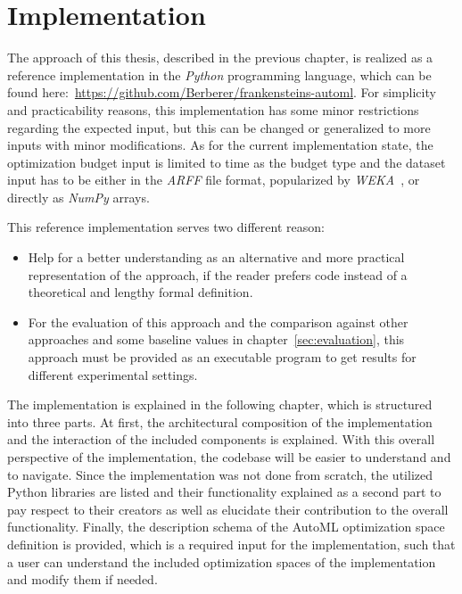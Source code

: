 %
\chapter{Implementation}
\label{sec:implementation}
The approach of this thesis, described in the previous chapter, is realized as a reference implementation in the \textit{Python} programming language, which can be found here:~\url{https://github.com/Berberer/frankensteins-automl}.\newline
For simplicity and practicability reasons, this implementation has some minor restrictions regarding the expected input, but this can be changed or generalized to more inputs with minor modifications.
As for the current implementation state, the optimization budget input is limited to time as the budget type and the dataset input has to be either in the \textit{ARFF} file format, popularized by \textit{WEKA}~\cite{Witten-Weka}, or directly as \textit{NumPy} arrays.

This reference implementation serves two different reason:
\begin{itemize}
	\item Help for a better understanding as an alternative and more practical representation of the approach, if the reader prefers code instead of a theoretical and lengthy formal definition.
	\item For the evaluation of this approach and the comparison against other approaches and some baseline values in chapter~\ref{sec:evaluation}, this approach must be provided as an executable program to get results for different experimental settings.
\end{itemize}

The implementation is explained in the following chapter, which is structured into three parts.
At first, the architectural composition of the implementation and the interaction of the included components is explained.
With this overall perspective of the implementation, the codebase will be easier to understand and to navigate.
Since the implementation was not done from scratch, the utilized Python libraries are listed and their functionality explained as a second part to pay respect to their creators as well as elucidate their contribution to the overall functionality.
Finally, the description schema of the AutoML optimization space definition is provided, which is a required input for the implementation, such that a user can understand the included optimization spaces of the implementation and modify them if needed.

